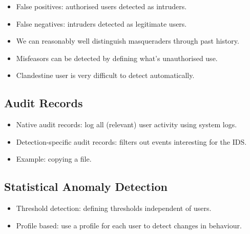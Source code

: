 \begin{frame}
  \begin{itemize}
    \item False positives: authorised users detected as intruders.

    \item False negatives: intruders detected as legitimate users.

    \item We can reasonably well distinguish masqueraders through past history.

    \item Misfeasors can be detected by defining what's unauthorised use.

    \item Clandestine user is very difficult to detect automatically.

  \end{itemize}
\end{frame}

\subsection{Audit Records}

\begin{frame}
  \begin{itemize}
    \item Native audit records: log all (relevant) user activity using system 
      logs.

    \item Detection-specific audit records: filters out events interesting for 
      the IDS.
      
    \item Example: copying a file.

  \end{itemize}
\end{frame}

\subsection{Statistical Anomaly Detection}

\begin{frame}
  \begin{itemize}
    \item Threshold detection: defining thresholds independent of users.

    \item Profile based: use a profile for each user to detect changes in 
      behaviour.

  \end{itemize}
\end{frame}

